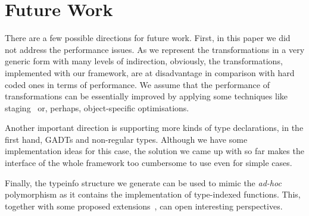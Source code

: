 \section{Future Work}

There are a few possible directions for future work. First, in this paper we did not address the performance issues. As we represent
the transformations in a very generic form with many levels of indirection, obviously, the transformations, implemented with
our framework, are at disadvantage in comparison with hard coded ones in terms of performance. We assume that the performance of transformations
can be essentially improved by applying some techniques like staging~\cite{Staged} or, perhaps, object-specific optimisations.

Another important direction is supporting more kinds of type declarations, in the first hand, GADTs and non-regular types. Although we have some
implementation ideas for this case, the solution we came up with so far makes the interface of the whole framework too cumbersome to use even for
simple cases.

Finally, the typeinfo structure we generate can be used to mimic the \emph{ad-hoc} polymorphism as it contains the implementation of
type-indexed functions. This, together with some proposed extensions~\cite{ModularImplicits}, can open interesting perspectives.

